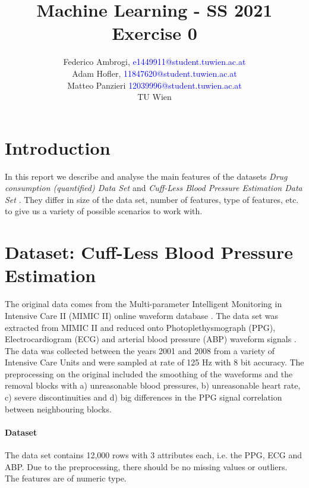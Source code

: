 \documentclass{article}
\begin{document}
\title{ Machine Learning - SS 2021 \\ Exercise 0 } 


	\author{Federico Ambrogi, \textcolor{blue} {e1449911@student.tuwien.ac.at } \\
	Adam Hofler, \textcolor{blue} {11847620@student.tuwien.ac.at } \\
	Matteo Panzieri \textcolor{blue}{12039996@student.tuwien.ac.at } \\
    TU Wien }






\maketitle
\setcounter{tocdepth}{2}
\tableofcontents

\section*{Introduction}
In this report we describe and analyse the main features of the datasets \textit{Drug consumption (quantified) Data Set
}\cite{DrugConsumption} and \textit{Cuff-Less Blood Pressure Estimation Data Set} \cite{BloodPressure}.
They differ in size of the data set, number of features, type of features, etc. to give us a variety of possible scenarios to work with.

\section{Dataset: Cuff-Less Blood Pressure Estimation}
The original data comes from the Multi-parameter Intelligent Monitoring in Intensive Care II (MIMIC II) online waveform database \cite{BloodPressureDatabase}\cite{Goldberger2000PhysioBankPA}. The data set was extracted from MIMIC II and reduced onto Photoplethysmograph (PPG), Electrocardiogram (ECG) and arterial blood pressure (ABP) waveform signals \cite{Kachuee2015CufflessHC}. The data was collected between the years 2001 and 2008 from a variety of Intensive Care Units and were sampled at rate of 125 Hz with 8 bit accuracy. The preprocessing on the original included the smoothing of the waveforms and the removal blocks with a) unreasonable blood pressures, b) unreasonable heart rate, c) severe discontinuities and d) big differences in the PPG signal correlation between neighbouring blocks.

\paragraph{Dataset}
\noindent The data set contains 12,000 rows with 3 attributes each, i.e. the PPG, ECG and ABP. Due to the preprocessing, there should be no missing values or outliers. The features are of numeric type.
\end{document}
